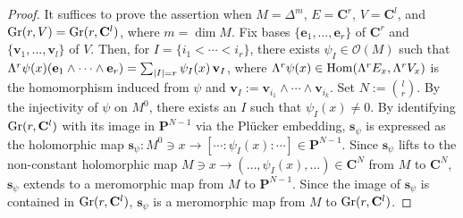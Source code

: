 \documentclass[amscd, leqno]{amsart}
\theoremstyle{plain}
\theoremstyle{definition}
\theoremstyle{remark}
\newenvironment{pf}{\begin{proof}}{\end{proof}}
\begin{document}
\begin{pf}
It suffices to prove the assertion when $M=\varDelta^{m}$, $E={\mathbf C}^{r}$, $V={\mathbf C}^{l}$, 
and ${\rm Gr}(r,V) = {\rm Gr}(r, {\mathbf C}^{l})$, where $m=\dim M$. 
Fix bases $\{ {\mathbf e}_{1}, \ldots, {\mathbf e}_{r} \}$ of ${\mathbf C}^{r}$ and $\{{\mathbf v}_{1},\ldots,{\mathbf v}_{l}\}$ of $V$. 
Then, for $I=\{i_{1}<\cdots<i_{r}\}$, there exists $\psi_{I} \in {\mathcal O}(M)$ such that 
$\Lambda^{r} \psi( x ) ( {\mathbf e}_{1}\wedge\cdots\wedge {\mathbf e}_{r}) = \sum_{ | I | = r} \psi_{I}(x)\,{\bf v}_{I}$, 
where $\Lambda^{r}\psi(x) \in {\rm Hom}( \Lambda^{r}E_{x}, \Lambda^{r}V_{x})$ is the homomorphism induced from $\psi$ and 
${\mathbf v}_{I}:={\mathbf v}_{i_{1}} \wedge \cdots \wedge {\mathbf v}_{i_{k}}$. Set $N:=\binom{l}{r}$. 
By the injectivity of $\psi$ on $M^{0}$, there exists an $I$ such that $\psi_{I}(x) \not=0$. 
By identifying ${\rm Gr}(r,{\bf C}^{l})$ with its image in ${\mathbf P}^{N-1}$ via the Pl\"ucker embedding, 
${\mathbf s}_{\psi}$ is expressed as the holomorphic map 
${\mathbf s}_{\psi} \colon M^{0} \ni x \to [\cdots : \psi_{I}(x) : \cdots ] \in {\mathbf P}^{N-1}$. 
Since ${\mathbf s}_{\psi}$ lifts to the non-constant holomorphic map $M \ni x \to (\ldots, \psi_{I}(x), \ldots) \in {\mathbf C}^{N}$ 
from $M$ to ${\mathbf C}^{N}$, ${\mathbf s}_{\psi}$ extends to a meromorphic map from $M$ to ${\mathbf P}^{N-1}$. 
Since the image of ${\mathbf s}_{\psi}$ is contained in ${\rm Gr}(r,{\mathbf C}^{l})$, 
${\mathbf s}_{\psi}$ is a meromorphic map from $M$ to ${\rm Gr}(r,{\mathbf C}^{l})$.
\end{pf}
\end{document}
